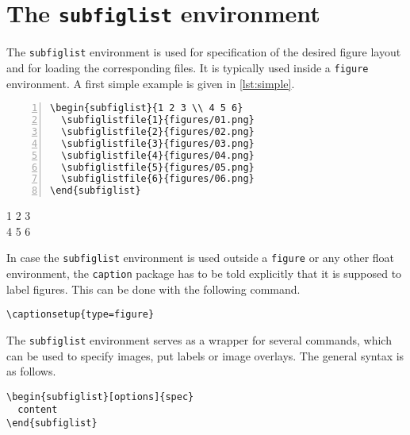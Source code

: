 \documentclass[version=3.12,american]{scrartcl}
\begin{document}
\section{The \texttt{subfiglist} environment}
The \texttt{subfiglist} environment is used for specification of the desired figure layout and for loading the corresponding files. It is typically used inside a \texttt{figure} environment. A first simple example is given in \cref{lst:simple}.

\begin{listing}
\begin{minipage}{0.4\textwidth}
\begin{Verbatim}[numbers=left]
\begin{subfiglist}{1 2 3 \\ 4 5 6}
  \subfiglistfile{1}{figures/01.png}
  \subfiglistfile{2}{figures/02.png}
  \subfiglistfile{3}{figures/03.png}
  \subfiglistfile{4}{figures/04.png}
  \subfiglistfile{5}{figures/05.png}
  \subfiglistfile{6}{figures/06.png}
\end{subfiglist}
\end{Verbatim}
\end{minipage}
\hfill
\begin{minipage}{0.5\textwidth}
\begin{subfiglist}{1 2 3 \\ 4 5 6}
\end{subfiglist}
\end{minipage}
\caption{Simple example of \texttt{subfiglist} environment usage}
\label{lst:simple}
\end{listing}

In case the \texttt{subfiglist} environment is used outside a \texttt{figure} or any other float environment, the \texttt{caption} package has to be told explicitly that it is supposed to label figures. This can be done with the following command.

\begin{verbatim}
\captionsetup{type=figure}
\end{verbatim}

The \texttt{subfiglist} environment serves as a wrapper for several commands, which can be used to specify images, put labels or image overlays. The general syntax is as follows.

\begin{verbatim}
\begin{subfiglist}[options]{spec}
  content
\end{subfiglist}
\end{verbatim}
\end{document}
